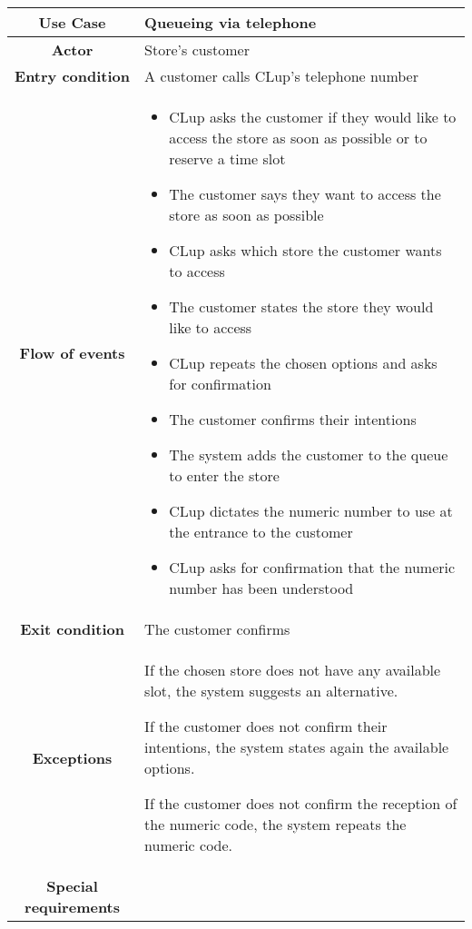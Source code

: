 \documentclass[../../main.tex]{subfiles}
\begin{document}
    \begin{table}[H]
      \centering
        \begin{tabular}{c m{}}
        \hline
        \textbf{Use Case} & Queueing via telephone\\ \hline
        \textbf{Actor} & Store's customer\\ \hline
        \textbf{Entry condition} & A customer calls CLup's telephone number\\  \hline
        \textbf{Flow of events} & \begin{itemize}
                                    \item CLup asks the customer if they would like to access the store as soon as possible or to reserve a time slot
                                    \item The customer says they want to access the store as soon as possible
                                    \item CLup asks which store the customer wants to access
                                    \item The customer states the store they would like to access
                                    \item CLup repeats the chosen options and asks for confirmation
                                    \item The customer confirms their intentions
                                    \item The system adds the customer to the queue to enter the store
                                    \item CLup dictates the numeric number to use at the entrance to the customer
                                    \item CLup asks for confirmation that the numeric number has been understood
                                  \end{itemize}\\ \hline
        \textbf{Exit condition} & The customer confirms \\ \hline
        \textbf{Exceptions} & If the chosen store does not have any available slot, the system suggests an alternative.
        
                              If the customer does not confirm their intentions, the system states again the available options.
                              
                              If the customer does not confirm the reception of the numeric code, the system repeats the numeric code.\\ \hline
        \textbf{Special requirements} &\\ \hline
        \end{tabular}
    \end{table}
\end{document}
